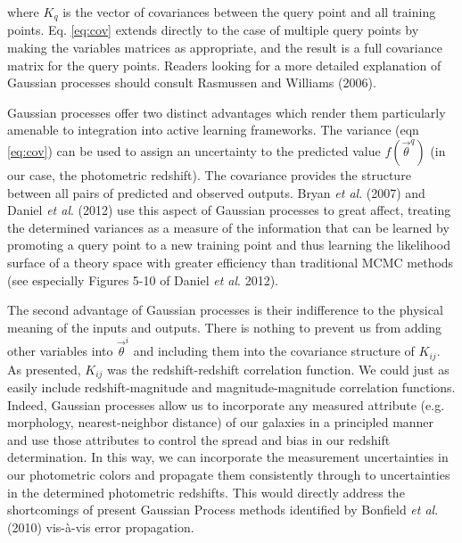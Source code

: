 \documentclass[prd, nofootinbib, floatfix, 12pt,tightenlines]{revtex4}
\begin{document}
\noindent
where $K_q$ is the vector of covariances between the query point and all
training points.  Eq. \ref{eq:cov} extends directly to the case of multiple
query points by making the variables matrices as appropriate, and the
result is a full covariance matrix for the query points.  Readers looking
for a more detailed explanation of Gaussian processes should consult
Rasmussen and Williams (2006).

Gaussian processes offer two distinct advantages which render them particularly
amenable to integration into active learning frameworks.
The variance (eqn \ref{eq:cov})
can be used to assign an uncertainty to the predicted value
$f(\vec{\theta}^{q})$ (in our case, the photometric redshift).  
The covariance
provides the structure between all pairs of predicted and observed outputs.
Bryan {\it et al}. (2007) and Daniel {\it et al}. (2012) use this aspect of
Gaussian processes to great affect, treating the determined variances as a
measure of the information that can be learned by promoting a query point
to a new training point and thus learning the likelihood surface of a
theory space with greater efficiency than traditional MCMC methods (see
especially Figures 5-10 of Daniel {\it et al}. 2012).

The second advantage of Gaussian processes is their indifference to the
physical meaning of the inputs and outputs.  There is nothing to prevent us
from adding other variables into $\vec{\theta}^{i}$ and including them
into the covariance structure of $K_{ij}$. As presented, $K_{ij}$ was the
redshift-redshift correlation function.  We could just as easily include
redshift-magnitude and magnitude-magnitude correlation functions.  
Indeed, Gaussian processes allow us to incorporate any measured attribute (e.g.
morphology, nearest-neighbor distance) of our galaxies in a principled manner
and use those attributes to control the spread and bias in our redshift
determination.
In this
way, we can incorporate the measurement uncertainties in our photometric
colors and propagate them consistently through to uncertainties in the
determined photometric redshifts.  This would directly address the
shortcomings of present Gaussian Process methods identified by Bonfield
{\it et al}. (2010) vis-\`a-vis error propagation.
\end{document}
